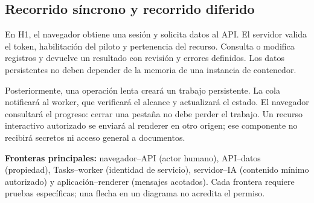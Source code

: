 \subsection{Recorrido síncrono y recorrido diferido}
En H1, el navegador obtiene una sesión y solicita datos al API. El servidor valida el token, habilitación del piloto y pertenencia del recurso. Consulta o modifica registros y devuelve un resultado con revisión y errores definidos. Los datos persistentes no deben depender de la memoria de una instancia de contenedor.

Posteriormente, una operación lenta creará un trabajo persistente. La cola notificará al worker, que verificará el alcance y actualizará el estado. El navegador consultará el progreso: cerrar una pestaña no debe perder el trabajo. Un recurso interactivo autorizado se enviará al renderer en otro origen; ese componente no recibirá secretos ni acceso general a documentos.

\noindent\textbf{Fronteras principales:} navegador--API (actor humano), API--datos (propiedad), Tasks--worker (identidad de servicio), servidor--IA (contenido mínimo autorizado) y aplicación--renderer (mensajes acotados). Cada frontera requiere pruebas específicas; una flecha en un diagrama no acredita el permiso.
